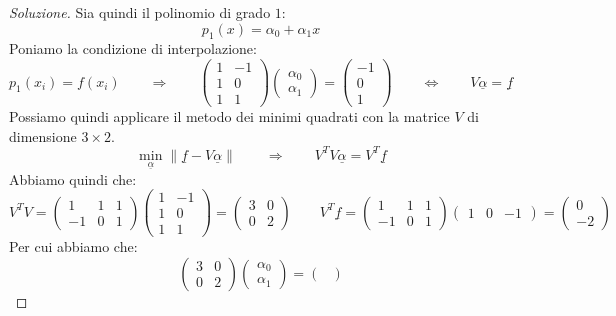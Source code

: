 \documentclass[11pt,a4paper,twoside]{article}
\theoremstyle{definition}
\newenvironment{sol}
	{\renewcommand\qedsymbol{$\blacksquare$}\begin{proof}[Soluzione]}
	{\end{proof}}
\begin{document}
\begin{sol}
	 Sia quindi il polinomio di grado $1$:
	\[ p_1(x) = \alpha_0 + \alpha_1 x \]
	Poniamo la condizione di interpolazione:
	\[
		p_1(x_i) = f(x_i) \qquad \Rightarrow \qquad
		\begin{pmatrix}
			1 & -1\\
			1 & 0\\
			1 & 1
		\end{pmatrix}
		\begin{pmatrix}
			\alpha_0\\ \alpha_1
		\end{pmatrix} =
		\begin{pmatrix}
			-1 \\ 0 \\ 1
		\end{pmatrix}
		\qquad \Leftrightarrow \qquad V \underline \alpha = \underline f
	\]
	Possiamo quindi applicare il metodo dei minimi quadrati con la matrice $V$ di dimensione $3 \times 2$.
	\[
		\min_{\underline \alpha}\|\underline f - V\underline \alpha\| \qquad \Rightarrow \qquad V^TV\underline \alpha = V^T \underline f
	\]
	Abbiamo quindi che:
	\[
		V^TV = \begin{pmatrix}
			1 & 1 & 1\\
			-1 & 0 & 1
		\end{pmatrix}
		\begin{pmatrix}
			1 & -1\\
			1 & 0\\
			1 & 1
		\end{pmatrix} =
		\begin{pmatrix}
			3 & 0\\
			0 & 2
		\end{pmatrix} \qquad V^T \underline f=
		\begin{pmatrix}
			1 & 1 & 1\\
			-1 & 0 & 1
		\end{pmatrix}
		\begin{pmatrix} 1 & 0 & -1 \end{pmatrix} = \begin{pmatrix}0 \\-2 \end{pmatrix}
	\]
	Per cui abbiamo che:
	\[
		\begin{pmatrix}
			3 & 0\\ 0 & 2
		\end{pmatrix}
		\begin{pmatrix}
			\alpha_0\\ \alpha_1
		\end{pmatrix} =
		\begin{pmatrix}

\end{pmatrix}\]
\end{sol}
\end{document}
